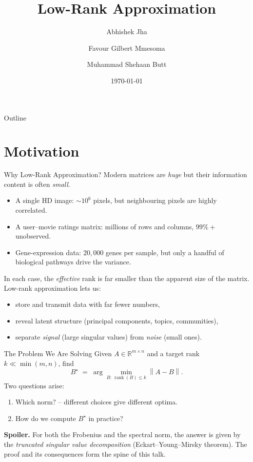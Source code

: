 \documentclass[10pt,aspectratio=169]{beamer}
\title[Low-Rank Approximation]{Low-Rank Approximation}
\author[Jha \and Gilbert \and Butt]{
  Abhishek Jha \and Favour Gilbert Mmesoma \and Muhammad Shehaan Butt
}
\institute[Uni.lu]{MSc Mathematical Modelling and Computational Sciences\\
University of Luxembourg}
\date{\today}
\DeclareMathOperator{\rank}{rank}
\newcommand{\R}{\mathbb{R}}
\newcommand{\norm}[1]{\left\|#1\right\|}
\begin{document}
\begin{frame}
  \titlepage
\end{frame}

\begin{frame}{Outline}
  \tableofcontents
\end{frame}

\section{Motivation}

\begin{frame}{Why Low-Rank Approximation?}
  Modern matrices are \emph{huge} but their information content is often \emph{small}.
  \begin{itemize}
    \item A single HD image: $\sim$$10^6$ pixels, but neighbouring pixels are highly correlated.
    \item A user--movie ratings matrix: millions of rows and columns, $99\%+$ unobserved.
    \item Gene-expression data: $20{,}000$ genes per sample, but only a handful of biological pathways drive the variance.
  \end{itemize}
  In each case, the \emph{effective} rank is far smaller than the apparent size of the matrix. Low-rank approximation lets us:
  \begin{itemize}
    \item store and transmit data with far fewer numbers,
    \item reveal latent structure (principal components, topics, communities),
    \item separate \emph{signal} (large singular values) from \emph{noise} (small ones).
  \end{itemize}
\end{frame}

\begin{frame}{The Problem We Are Solving}
  Given $A \in \R^{m\times n}$ and a target rank $k \ll \min(m,n)$, find
  \[
    B^\star \;=\; \arg\min_{B:\, \rank(B) \le k} \norm{A - B}.
  \]
  Two questions arise:
  \begin{enumerate}
    \item Which norm? -- different choices give different optima.
    \item How do we compute $B^\star$ in practice?
  \end{enumerate}
  \medskip
  \textbf{Spoiler.} For both the Frobenius and the spectral norm, the answer is given by the \emph{truncated singular value decomposition} (Eckart--Young--Mirsky theorem). The proof and its consequences form the spine of this talk.
\end{frame}
\end{document}
